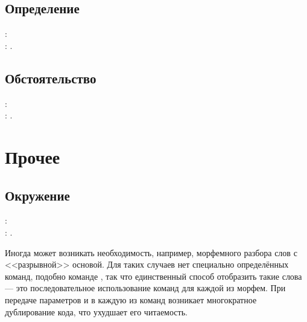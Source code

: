 \subsection{Определение}
\begin{tcolorbox}
    \rsTypeAux: \\
    \hspace*{1cm} \rsOptionsAux: .
\end{tcolorbox}

\subsection{Обстоятельство}
\begin{tcolorbox}
    \rsTypeAux: \\
    \hspace*{1cm} \rsOptionsAux: .
\end{tcolorbox}



\section{Прочее}

\subsection{Окружение }

\begin{tcolorbox}
    \noindent\rsTypeAux[env]: \\
    \hspace*{1cm} \rsOptionsAux: .
\end{tcolorbox}

Иногда может возникать необходимость, например, морфемного разбора слов с <<разрывной>> основой. Для таких случаев нет специально
определённых команд, подобно команде , так что единственный способ отобразить такие слова --- это
последовательное использование команд для каждой из морфем. При передаче параметров  и  в каждую из
команд возникает многократное дублирование кода, что ухудшает его читаемость.



